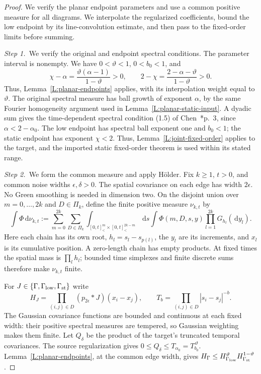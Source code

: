 \documentclass[12pt,oneside,openany]{book}
\numberwithin{equation}{section}
\theoremstyle{nogostyle}
\theoremstyle{definition}
\newcommand{\ud}{\,\mathrm{d}}
\begin{document}
\begin{proof}
  We verify the planar endpoint parameters and use a common positive measure
  for all diagrams. We interpolate the regularized coefficients, bound the low
  endpoint by its line-convolution estimate, and then pass to the fixed-order
  limits before summing.


  \medskip
  \noindent\textit{Step 1.~}We verify the original and endpoint spectral
  conditions.
  The parameter interval is nonempty. We have $0 < \vartheta < 1$, $0 < b_0 <
  1$, and
  \[
    \chi-\alpha=\frac{\vartheta(\alpha-1)}{1-\vartheta}>0,
    \qquad
    2-\chi=\frac{2-\alpha-\vartheta}{1-\vartheta}>0.
  \]
  Thus, Lemma~\ref{L:planar-endpoints} applies, with its interpolation weight
  equal to $\vartheta$. The original spectral measure has ball growth of
  exponent $\alpha$, by the same Fourier homogeneity argument used in
  Lemma~\ref{L:planar-static-input}. A dyadic sum gives the time-dependent
  spectral condition (1.5) of
  Chen~\cite{chen:author2026:time-dependency}*{p.~3}, since $\alpha <
  2-\alpha_0$. The low endpoint has spectral ball exponent one and $b_0 < 1$;
  the static endpoint has exponent $\chi < 2$. Thus,
  Lemma~\ref{L:joint-fixed-order} applies to the target, and the imported static
  fixed-order theorem is used within its stated range.


  \medskip
  \noindent\textit{Step 2.~}We form the common measure and apply Hölder.
  Fix $k \ge 1$, $t > 0$, and common noise widths $\epsilon,\delta > 0$. The
  spatial covariance on each edge has width $2\epsilon$. No Green smoothing is
  needed in dimension two. On the disjoint union over $m = 0,\ldots,2k$ and $D
  \in \Pi_k$, define the finite positive measure $\nu_{k,t}$ by
  \[
    \int\Phi\ud\nu_{k,t}
    :=\sum_{m=0}^{2k}\sum_{D\in\Pi_k}
    \int_{[0,t]^m_<\times[0,t]^{2k-m}_<}\ud s
    \int\Phi(m,D,s,y)\prod_{l=1}^{2k}G_{h_l}(\ud y_l).
  \]
  Here each chain has its own root, $h_l = s_l-s_{p(l)}$, the $y_l$ are its
  increments, and $x_l$ is its cumulative position. A zero-length chain has
  empty products. At fixed times the spatial mass is $\prod_lh_l$; bounded time
  simplexes and finite discrete sums therefore make $\nu_{k,t}$ finite.

  For $J \in \{\Gamma,\Gamma_{\rm low},\Gamma_{\rm st}\}$ write
  \[
    H_J=\prod_{(i,j)\in D}(p_{2\epsilon}*J)(x_i-x_j),\qquad
    T_b=\prod_{(i,j)\in D}|s_i-s_j|^{-b}.
  \]
  The Gaussian covariance functions are bounded and continuous at each fixed
  width: their positive spectral measures are tempered, so Gaussian weighting
  makes them finite. Let $Q_\delta$ be the product of the target's truncated
  temporal covariances. The source regularization gives $0 \le Q_\delta \le
  T_{\alpha_0} = T_{b_0}^{\,\vartheta}$. Lemma~\ref{L:planar-endpoints}, at the
  common edge width, gives $H_\Gamma \le H_{\Gamma_{\rm low}}^\vartheta
  H_{\Gamma_{\rm st}}^{1-\vartheta}$.


\end{proof}
\end{document}
